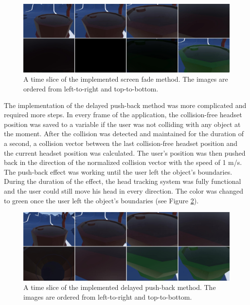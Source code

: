 \begin{figure}[th]
\centering
\includegraphics[width=1\textwidth]{img/fade_implementation.jpg}
\caption{A time slice of the implemented screen fade method. The images are ordered from left-to-right and top-to-bottom.}
\label{fig:fadeimplementation}
\end{figure}

The implementation of the delayed push-back method was more complicated and required more steps. In every frame of the application, the collision-free headset position was saved to a variable if the user was not colliding with any object at the moment. After the collision was detected and maintained for the duration of a second, a collision vector between the last collision-free headset position and the current headset position was calculated. The user's position was then pushed back in the direction of the normalized collision vector with the speed of 1 m/s. The push-back effect was working until the user left the object's boundaries. During the duration of the effect, the head tracking system was fully functional and the user could still move his head in every direction. The color was changed to green once the user left the object's boundaries (see Figure \ref{fig:delayedimplementation}).

\begin{figure}[th]
\centering
\includegraphics[width=1\textwidth]{img/delayed_implementation.jpg}
\caption{A time slice of the implemented delayed push-back method. The images are ordered from left-to-right and top-to-bottom.}
\label{fig:delayedimplementation}
\end{figure}

